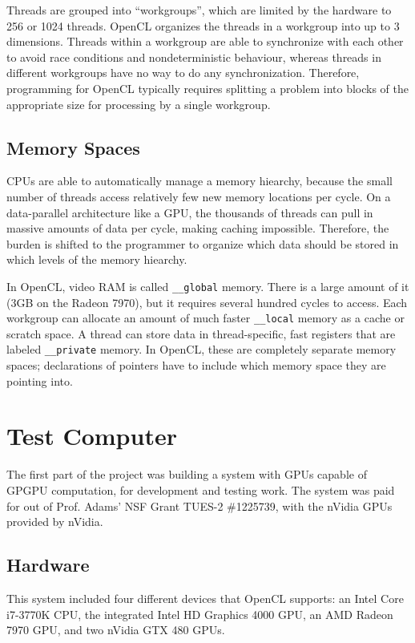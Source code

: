 \documentclass{article}
\begin{document}
Threads are grouped into ``workgroups'', which are limited by the hardware to 256 or 1024 threads. OpenCL organizes the threads in a workgroup into up to 3 dimensions. Threads within a workgroup are able to synchronize with each other to avoid race conditions and nondeterministic behaviour, whereas threads in different workgroups have no way to do any synchronization. Therefore, programming for OpenCL typically requires splitting a problem into blocks of the appropriate size for processing by a single workgroup.

\subsection{Memory Spaces}
CPUs are able to automatically manage a memory hiearchy, because the small number of threads access relatively few new memory locations per cycle. On a data-parallel architecture like a GPU, the thousands of threads can pull in massive amounts of data per cycle, making caching impossible. Therefore, the burden is shifted to the programmer to organize which data should be stored in which levels of the memory hiearchy.

In OpenCL, video RAM is called \texttt{\_\_global} memory. There is a large amount of it (3GB on the Radeon 7970), but it requires several hundred cycles to access. Each workgroup can allocate an amount of much faster \texttt{\_\_local} memory as a cache or scratch space. A thread can store data in thread-specific, fast registers that are labeled \texttt{\_\_private} memory. In OpenCL, these are completely separate memory spaces; declarations of pointers have to include which memory space they are pointing into.

\section{Test Computer}
The first part of the project was building a system with GPUs capable of GPGPU computation, for development and testing work. The system was paid for out of Prof. Adams' NSF Grant TUES-2 \#1225739, with the nVidia GPUs provided by nVidia.

\subsection{Hardware}
This system included four different devices that OpenCL supports: an Intel Core i7-3770K CPU, the integrated Intel HD Graphics 4000 GPU, an AMD Radeon 7970 GPU, and two nVidia GTX 480 GPUs.
\end{document}

